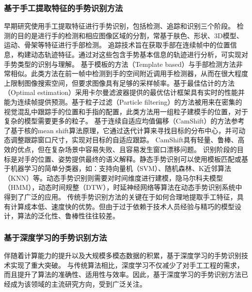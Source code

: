 \subsubsection{基于手工提取特征的手势识别方法}
早期研究使用手工提取特征进行手势识别，包括检测、追踪和识别三个阶段\cite{rautaray2015vision}。
检测的目的是进行手的检测和相应图像区域的分割，常基于肤色\cite{sigal2004skin}、形状\cite{chen2007real}、3D模型\cite{tekin2019h+}、运动\cite{pun2011real}、骨架\cite{jiang2021chal21}等特征进行手部检测。
追踪技术旨在获取手部在连续帧中的位置信息，构建动态轨迹特征。通过对这些包含手势基本信息的轨迹进行分析，可实现对手势类型的识别与理解。
基于模板的方法（Template based）\cite{crowley1995finger}与手部检测方法非常相似。此类方法在前一帧中检测到手的空间附近调用手检测器，从而在很大程度上限制图像搜索空间，但要求图像具有足够的采样帧率。基于最佳估计的方法（Optimal estimation）\cite{argyros2004real}采用卡尔曼滤波器\cite{kalman1960new}提供的最优估计框架具有实时的性能并能为连续帧提供预测。基于粒子过滤（Particle filtering）的方法\cite{perez2002color}被用来在密集的视觉混乱中跟踪手的位置和手指的配置，此类方法用一组粒子建模手的位置，对于复杂的模型需要更多的粒子。
基于连续自适应均值偏移（CamShift）的方法\cite{wang2010study}参考了基于核的mean shift算法原理，它通过迭代计算来寻找目标的分布中心，并可动态调整跟踪窗口尺寸，实现对目标的自适应跟踪。
CamShift具有轻量、鲁棒、高效的优点，但在复杂场景中容易失败、且容易发生窗口漂移问题。
识别阶段的目标是对手的位置、姿势提供最终的语义解释。静态手势识别可以使用模板匹配或基于机器学习的简单分类器\cite{基于视觉的动态手势识别研究综述}，如：支持向量机（SVM）\cite{burges1998tutorial}、随机森林\cite{基于视觉的动态手势识别研究综述}、K近邻算法（KNN）\cite{thirumuruganathan2010knn}等。动态手势识别则需要对时间维度进行建模，隐马尔科夫模型（HMM）\cite{liang1996sign}，动态时间规整（DTW）\cite{corradini2001dynamic}，时延神经网络\cite{sigal2004skin}等算法在动态手势识别系统中得到了广泛的应用。
传统手势识别方法的关键在于如何合理地提取手工特征，具有计算成本低、速度快的优势。但由于过于依赖于技术人员经验与精巧的模型设计，算法的泛化性、鲁棒性往往较差。

\subsubsection{基于深度学习的手势识别方法} %
伴随着计算能力的提升以及大规模多模态数据的积累，基于深度学习的手势识别技术实现了重大突破。
与传统算法相比，深度学习不仅减少了对手工工程的需求，而且提升了算法的准确性、适用性与效率。因此，基于深度学习的手势识别方法已经成为该领域的主流研究方向，受到广泛关注。

